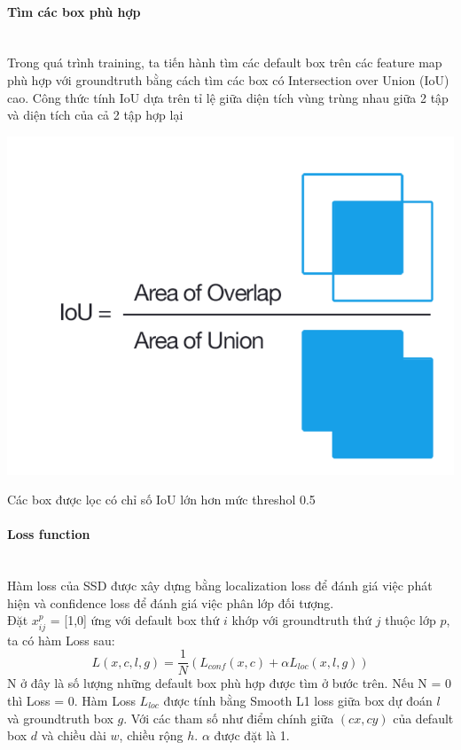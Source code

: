 \documentclass[a4paper,10pt]{article}
\begin{document}
\paragraph{Tìm các box phù hợp}
\mbox{}\\Trong quá trình training, ta tiến hành tìm các default box trên các feature map phù hợp với groundtruth bằng cách tìm các box có Intersection over Union (IoU) cao. Công thức tính IoU dựa trên tỉ lệ giữa diện tích vùng trùng nhau giữa 2 tập và diện tích của cả 2 tập hợp lại
\begin{center}
\includegraphics[scale=.5]{image/iou}
\end{center}
Các box được lọc có chỉ số IoU lớn hơn mức threshol 0.5
\paragraph{Loss function}
\mbox{}\\Hàm loss của SSD được xây dựng bằng localization loss để đánh giá việc phát hiện và confidence loss để đánh giá việc phân lớp đối tượng.
\\Đặt \(x_{ij}^p\) = [1,0] ứng với default box thứ \(i\) khớp với groundtruth thứ \(j\) thuộc lớp \(p\), ta có hàm Loss sau:
\[L\left( x,c,l,g \right) = \frac{1}{N} \left( L_{conf} \left( x,c \right) + \alpha L_{loc}\left(x,l,g\right)\right)\]
N ở đây là số lượng những default box phù hợp được tìm ở bước trên. Nếu N = 0 thì Loss = 0. Hàm Loss \(L_{loc}\) được tính bằng Smooth L1 loss giữa box dự đoán \(l\) và groundtruth box \(g\). Với các tham số như điểm chính giữa \(\left(cx,cy\right)\) của default box \(d\) và chiều dài \(w\), chiều rộng \(h\). \(\alpha\) được đặt là 1.
\end{document}
